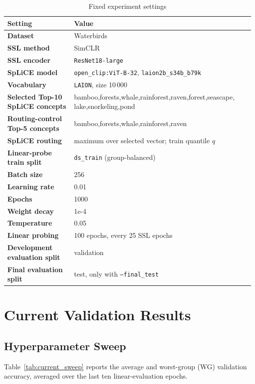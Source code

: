 \documentclass[11pt,a4paper]{article}
\begin{document}
\begin{table}[h]
\centering
\caption{Fixed experiment settings}
\begin{tabularx}{\textwidth}{>{\bfseries}l X}
\toprule
Setting & Value \\
\midrule
Dataset & Waterbirds \\
SSL method & SimCLR \\
SSL encoder & \texttt{ResNet18-large} \\
SpLiCE model & \texttt{open\_clip:ViT-B-32}, \texttt{laion2b\_s34b\_b79k} \\
Vocabulary & \texttt{LAION}, size 10\,000 \\
Selected Top-10 SpLiCE concepts & bamboo,forests,whale,rainforest,raven,forest,seascape,
lake,snorkeling,pond \\
Routing-control Top-5 concepts & bamboo,forests,whale,rainforest,raven \\
SpLiCE routing & maximum over selected vector; train quantile $q$ \\
Linear-probe train split & \texttt{ds\_train} (group-balanced) \\
Batch size & 256 \\
Learning rate & 0.01 \\
Epochs & 1000 \\
Weight decay & 1e-4 \\
Temperature & 0.05 \\
Linear probing & 100 epochs, every 25 SSL epochs \\
Development evaluation split & validation \\
Final evaluation split & test, only with \texttt{--final\_test} \\
\bottomrule
\end{tabularx}
\end{table}

\section{Current Validation Results}

\subsection{Hyperparameter Sweep}

Table~\ref{tab:current_sweep} reports the average and worst-group (WG)
validation accuracy, averaged over the last ten linear-evaluation epochs.
\end{document}
